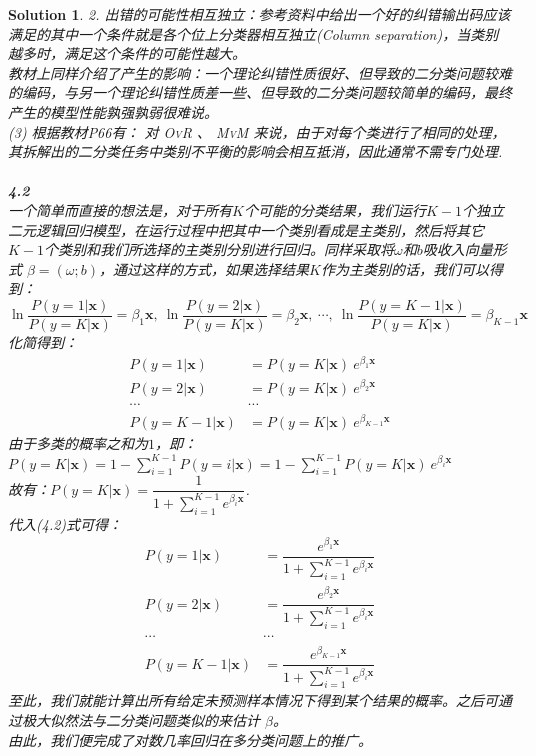 \documentclass[a4paper,UTF8]{article}
\numberwithin{equation}{section}
\newtheorem*{solution}{Solution}
\begin{document}
\begin{solution}
2. 出错的可能性相互独立：参考资料\textsc{\cite{dietterich1994solving}}中给出一个好的纠错输出码应该满足的其中一个条件就是各个位上分类器相互独立(Column separation)，当类别越多时，满足这个条件的可能性越大。\\\indent 教材上同样介绍了产生的影响：一个理论纠错性质很好、但导致的二分类问题较难的编码，与另一个理论纠错性质差一些、但导致的二分类问题较简单的编码，最终产生的模型性能孰强孰弱很难说。\\
\textsc{(3)} 根据教材\textsc{P66}有：
对 \textsc{OvR} 、 \textsc{MvM} 来说，由于对每个类进行了相同的处理，其拆解出的二分类任务中类别不平衡的影响会相互抵消，因此通常不需专门处理.\\
~\\\textbf{4.2}\\
一个简单而直接的想法是，对于所有$K$个可能的分类结果，我们运行$K-1$个独立二元逻辑回归模型，在运行过程中把其中一个类别看成是主类别，然后将其它$K-1$个类别和我们所选择的主类别分别进行回归。同样采取将$\omega$和$b$吸收入向量形式 $\beta=(\omega;b)$，通过这样的方式，如果选择结果$K$作为主类别的话，我们可以得到：
\begin{equation}
\ln\frac{P(y=1|\mathbf{x})}{P(y=K|\mathbf{x})} = \beta_1\mathbf{x},\	\ln\frac{P(y=2|\mathbf{x})}{P(y=K|\mathbf{x})} = \beta_2\mathbf{x},\ \cdots,\	\ln\frac{P(y=K-1|\mathbf{x})}{P(y=K|\mathbf{x})} = \beta_{K-1}\mathbf{x}
\end{equation}
化简得到：
\begin{equation}
\begin{aligned}
P(y=1|\mathbf{x}) &= P(y=K|\mathbf{x})\ e^{\beta_1\mathbf{x}}\\
P(y=2|\mathbf{x}) &= P(y=K|\mathbf{x})\ e^{\beta_2\mathbf{x}}\\
\cdots & \cdots \\
P(y=K-1|\mathbf{x}) &= P(y=K|\mathbf{x})\ e^{\beta_{K-1}\mathbf{x}}
\end{aligned}
\end{equation}
由于多类的概率之和为$1$，即：$P(y=K|\mathbf{x}) = 1 - \sum\limits_{i=1}^{K-1}P(y=i|\mathbf{x}) = 1 - \sum\limits_{i=1}^{K-1}P(y=K|\mathbf{x})\ e^{\beta_i\mathbf{x}}$\\
故有：$P(y=K|\mathbf{x}) = \dfrac{1}{1+\sum\limits_{i=1}^{K-1}e^{\beta_i\mathbf{x}}}$.\\
代入\textsc{(4.2)}式可得：
\begin{equation}
\begin{aligned}
P(y=1|\mathbf{x}) &= \dfrac{e^{\beta_1\mathbf{x}}}{1+\sum\limits_{i=1}^{K-1}e^{\beta_i\mathbf{x}}}\\
P(y=2|\mathbf{x}) &= \dfrac{e^{\beta_2\mathbf{x}}}{1+\sum\limits_{i=1}^{K-1}e^{\beta_i\mathbf{x}}}\\
\cdots & \cdots \\
P(y=K-1|\mathbf{x}) &= \dfrac{e^{\beta_{K-1}\mathbf{x}}}{1+\sum\limits_{i=1}^{K-1}e^{\beta_i\mathbf{x}}}
\end{aligned}
\end{equation}
至此，我们就能计算出所有给定未预测样本情况下得到某个结果的概率。之后可通过极大似然法与二分类问题类似的来估计 $\beta$。
\\由此，我们便完成了对数几率回归在多分类问题上的推广。
\end{solution}



\end{document}

